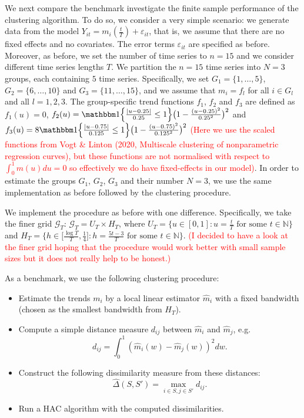 \documentclass[12pt]{article}
\begin{document}
{We next compare the benchmark investigate the finite sample performance of the clustering algorithm.%
To do so, we consider a very simple scenario: we generate data from the model $Y_{it} = m_i(\frac{t}{T}) + \varepsilon_{it}$, that is, we assume that there are no fixed effects and no covariates. The error terms $\varepsilon_{it}$ are specified as before. Moreover, as before, we set the number of time series to $n = 15$ and we consider different time series lengths $T$. We partition the $n = 15$ time series into $N=3$ groups, each containing $5$ time series. Specifically, we set $G_1 = \{1,\ldots, 5\}$, $G_2 = \{6,\ldots, 10\}$ and $G_3 =  \{11,\ldots, 15\}$, and we assume that $m_i = f_l$ for all $i \in G_l$ and all $l = 1, 2, 3$. The group-specific trend functions $f_1$, $f_2$ and $f_3$ are defined as $f_1(u) = 0$, $f_2(u) = \ind\Big\{\frac{|u - 0.25|}{0.25}\leq 1\Big\} \big(1 - \frac{(u - 0.25)^2}{0.25^2}\big)^2$ and $f_3(u) = 8 \ind\Big\{\frac{|u - 0.75|}{0.125}\leq 1\Big\} \big(1 - \frac{(u - 0.75)^2}{0.125^2}\big)^2$ \textcolor{red}{(Here we use the scaled functions from Vogt \& Linton (2020, Multiscale clustering of nonparametric regression curves), but these functions are not normalised with respect to $\int_0^1 m(u)du =0$ so effectively we do have fixed-effects in our model)}. In order to estimate the groups $G_1$, $G_2$, $G_3$ and their number $N = 3$, we use the same implementation as before followed by the clustering procedure.%

We implement the procedure as before with one difference. Specifically, we take the finer grid $\mathcal{G}_T$: $\mathcal{G}_T = U_T \times H_T$, where $U_T = \big\{ u \in [0,1]: u = \textstyle{\frac{t}{T}} \text{ for some } t \in \mathbb{N} \big\}$ and $H_T = \big\{ h \in \big[ \textstyle{\frac{\log T}{T}}, \textstyle{\frac{1}{4}} \big]:  h = \textstyle{\frac{5t - 3}{T}} \text{ for some } t \in \mathbb{N} \big\}$. \textcolor{red}{(I decided to have a look at the finer grid hoping that the procedure would work better with small sample sizes but it does not really help to be honest.)}

As a benchmark, we use the following clustering procedure:
\begin{itemize}[label=--,leftmargin=0.45cm,itemsep=0pt,topsep=0pt]
\item Estimate the trends $m_i$ by a local linear estimator $\hat{m}_i$ with a fixed bandwidth (chosen as the smallest bandwidth from $H_T$).
\item Compute a simple distance measure $d_{ij}$ between $\hat{m}_i$ and $\hat{m}_j$, e.g.
\[ d_{ij} = \int_0^1 (\hat{m}_i(w) - \hat{m}_j(w))^2 dw. \]
\item Construct the following dissimilarity measure from these distances:
\[ \hat{\Delta}(S,S') = \max_{i \in S,j \in S'} d_{ij}. \]
\item Run a HAC algorithm with the computed dissimilarities. 
\end{itemize}

}
\end{document}
